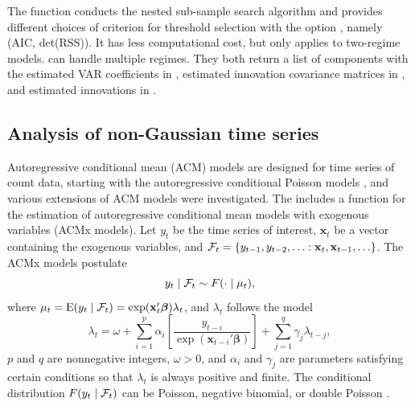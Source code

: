 

The function  conducts the nested sub-sample search algorithm and provides different choices of criterion for threshold selection with the option , namely (AIC, det(RSS)). It has less computational cost, but only applies to two-regime models.  can handle multiple regimes. They both return a list of components with the estimated VAR coefficients in , estimated innovation covariance matrices in , and estimated innovations in .


\subsection{Analysis of non-Gaussian time series}
Autoregressive conditional mean (ACM) models are designed for time series of count data, starting with the autoregressive conditional Poisson models \citep{heinen2003}, and various extensions of ACM models were investigated. The  includes a function  for the estimation of autoregressive conditional mean models with exogenous variables (ACMx models). Let $y_t$ be the time series of interest, $\mathbf{x}_t$ be a vector containing the exogenous variables, and ${\cal{F}}_t=\{ y_{t-1},y_{t-2},\ldots: \mathbf{x}_t, \mathbf{x}_{t-1},\ldots \}$. The ACMx models postulate
\[
y_t\mid {\cal F}_t \sim F(\cdot \mid \mu_t),
\]
where $\mu_t={\rm E}(y_t \mid {\cal F}_t)= \exp ({\mathbf x}_t' {\boldsymbol{\beta}})\lambda_t$,
and $\lambda_t$ follows the model
\[
\lambda_t=\omega+\sum_{i=1}^p \alpha_i\left[ \frac{y_{t-i}}{\exp(\mathbf{x}_{t-i}' \boldsymbol{\beta})}\right] +\sum_{j=1}^q \gamma_j \lambda_{t-j},
\]
$p$ and $q$ are nonnegative integers, $\omega>0$, and $\alpha_i$ and $\gamma_j$ are parameters satisfying certain conditions so that $\lambda_t$ is always positive and finite. The conditional distribution $F(y_t\mid {\cal F}_t)$ can be Poisson, negative binomial, or double Poisson \citep{tsay2018}.

